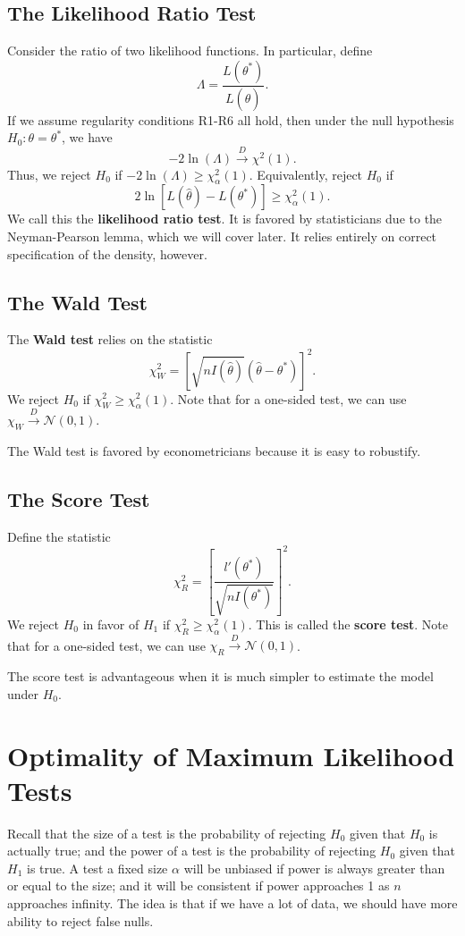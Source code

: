 \documentclass[12pt]{article}
\newcommand{\thetahat}{\hat{\theta}}
\newcommand{\normal}[2]{\mathcal{N} \left({#1}, {#2} \right)}
\newcommand{\cdist}{\overset{D}{\rightarrow}}
\renewcommand{\hat}[1]{\widehat{#1}}
\theoremstyle{definition}
\begin{document}
\subsection{The Likelihood Ratio Test}
Consider the ratio of two likelihood functions. In particular, define
	\[	\Lambda = \frac{L(\theta^*)}{L(\thetahat)}.\]
If we assume regularity conditions R1-R6 all hold, then under the null hypothesis $H_0 : \theta=\theta^*$, we have
	\[-2 \ln (\Lambda) \cdist \chi^2(1).	\]
Thus, we reject $H_0$ if $-2\ln(\Lambda) \geq \chi_{\alpha}^2(1)$. 	Equivalently, reject $H_0$ if
	\[	2 \ln[L(\thetahat)-L(\theta^*)] \geq \chi_{\alpha}^2(1).	\]
We call this the \textbf{likelihood ratio test}. It is favored by statisticians due to the Neyman-Pearson lemma, which we will cover later. It relies entirely on correct specification of the density, however. 
	

\subsection{The Wald Test}
The \textbf{Wald test} relies on the statistic
	\[	\chi_W^2 = \left[\sqrt{n I(\thetahat)} ( \thetahat - \theta^*) \right] ^2.\]
We reject $H_0$ if $\chi_W^2 \geq \chi_{\alpha}^2(1)$. Note that for a one-sided test, we can use $\chi_W \cdist \normal{0}{1}$. 

The Wald test is favored by econometricians because it is easy to robustify. 



\subsection{The Score Test}
Define the statistic
	\[\chi_R^2 = \left[\frac{l'(\theta^*)}{\sqrt{nI(\theta^*)}}\right]^2.	 \]	
We reject $H_0$ in favor of $H_1$ if $\chi^2_R \geq \chi_{\alpha}^2(1)$.  This is called the \textbf{score test}. Note that for a one-sided test, we can use $\chi_R \cdist \normal{0}{1}$. 

The score test is advantageous when it is much simpler to estimate the model under $H_0$. 




\section{Optimality of Maximum Likelihood Tests}

Recall that the size of a test is the probability of rejecting $H_0$ given that  $H_0$ is actually true; and the power of a test is the probability of rejecting $H_0$ given that $H_1$ is true. A test a fixed size $\alpha$ will be unbiased if power is always greater than or equal to the size; and it will be consistent if power approaches 1 as $n$ approaches infinity. The idea is that if we have a lot of data, we should have more ability to reject false nulls. 
\end{document}
